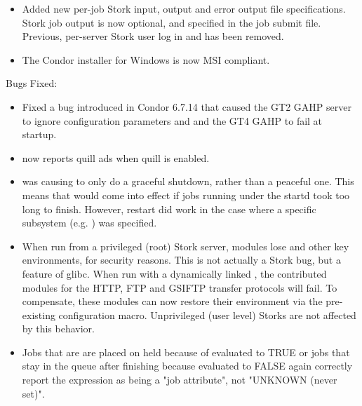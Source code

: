 \begin{itemize}
\item Added new per-job Stork input, output and error output file
specifications.  Stork job output is now optional, and
specified in the job submit file.  Previous, per-server Stork user log in 
 and  has been
removed.

\item The Condor installer for Windows is now MSI compliant.

\end{itemize}

\noindent Bugs Fixed:

\begin{itemize}

\item Fixed a bug introduced in Condor 6.7.14 that caused the GT2 GAHP
server to ignore configuration parameters  and
 and the GT4 GAHP to fail at startup.

\item {}  now reports quill ads when quill is enabled.

\item {}  was causing  to only
do a graceful shutdown, rather than a peaceful one.  This means that
 would come into effect if jobs running
under the startd took too long to finish.  However,  restart
did work in the case where a specific subsystem (e.g. ) was
specified.

\item When run from a privileged (root) Stork server, modules lose
 and other key environments, for security
reasons.  This is not actually a Stork bug, but a feature of glibc.
When run with a dynamically linked , the
contributed modules for the HTTP, FTP and GSIFTP transfer protocols
will fail.  To compensate, these modules can now restore their
environment via the pre-existing 
configuration macro.  Unprivileged (user level) Storks are not
affected by this behavior.

\item  Jobs that are are placed on held because of 
evaluated to TRUE or jobs that stay in the queue after finishing because
 evaluated to FALSE again correctly report the
expression as being a "job attribute", not "UNKNOWN (never set)".


\end{itemize}
